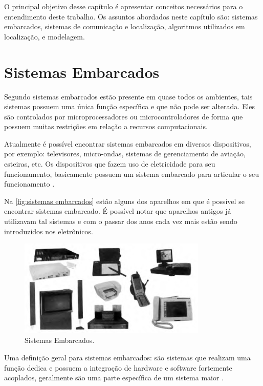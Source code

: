 \label{chapter:conceitos}
O principal objetivo desse capítulo é apresentar conceitos necessários para o entendimento deste trabalho.
Os assuntos abordados neste capítulo são:  
sistemas embarcados, sistemas de comunicação e localização, algoritmos utilizados em localização, e modelagem.

\section{Sistemas Embarcados}

Segundo  sistemas embarcados estão presente em quase todos os ambientes, tais sistemas possuem uma única função específica e que não pode ser alterada. Eles são controlados por microprocessadores ou microcontroladores de forma que possuem muitas restrições em relação a recursos computacionais.

    \par
    Atualmente é possível encontrar sistemas embarcados em diversos dispositivos, por exemplo: televisores, micro-ondas, sistemas de gerenciamento de aviação, esteiras, etc. Os dispositivos que fazem uso de eletricidade para seu funcionamento, basicamente possuem um sistema embarcado para articular o seu funcionamento \cite{rodrigo2016}.
    
    \par
    Na \autoref{fig:sistemas embarcados} estão alguns dos aparelhos em que é possível se encontrar sistemas embarcado. É possível notar que aparelhos antigos já utilizavam tal sistemas e com o passar dos anos cada vez mais estão sendo introduzidos nos eletrônicos.
    \begin{figure}[h!]
              \caption{\label{fig:sistemas embarcados}{Sistemas Embarcados.}}
              \centering
              \includegraphics[width=0.8\textwidth]{Figuras/systems_embedded.PNG}
            \end{figure}
    \par
    Uma definição geral para sistemas embarcados: são sistemas que realizam uma função dedica e possuem a integração
    de hardware e software fortemente acoplados, geralmente são uma parte específica de um sistema maior \cite{Li:2003:RCE:829584}.
    
